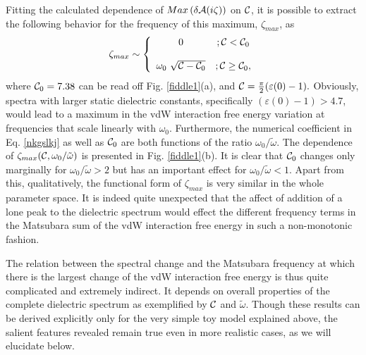 \documentclass[letterpaper,twocolumn,amsmath,amssymb,floatfix,aps,superscriptaddress]{revtex4}
\begin{document}
Fitting the calculated dependence of $Max\left(\delta{\cal A}(i\zeta)\right)$ on ${\cal C}$, it is possible to extract the following behavior for the frequency of this maximum, $\zeta_{max}$, as 
\begin{equation}
\zeta_{max} \sim \left\{
\begin{array}{cc}
0 &;  {\cal C} < {{\cal C}_0} \\
~ & ~ \\
 \omega_0 ~ \sqrt{{\cal C}-{{\cal C}_0}} &;  {\cal C} \geq {\cal C}_0, \\
\end{array}\right.  
\label{nkgslkj}
\end{equation}
where ${\cal C}_0 = 7.38$ can be read off Fig. \ref{fiddle1}(a), and ${\cal C} = \frac{\pi}{2}(\varepsilon(0) - 1).$ Obviously, spectra with larger static dielectric constants, specifically $(\varepsilon(0) - 1) > 4.7$, would lead to a maximum in the vdW interaction free energy variation at frequencies that scale linearly with $\omega_0$.  Furthermore, the numerical coefficient in Eq. \ref{nkgslkj} as well as ${\cal C}_0$ are both functions of the ratio ${\omega_0}/{\tilde\omega}$. The dependence of $\zeta_{max}({\cal C}, {\omega_0}/{\tilde\omega})$  is presented in Fig. \ref{fiddle1}(b). It is clear that ${\cal C}_0$ changes only marginally for ${\omega_0}/{\tilde\omega} > 2$ but has an important effect for ${\omega_0}/{\tilde\omega} < 1$. Apart from this, qualitatively, the functional form of $\zeta_{max}$ is very similar in the whole parameter space. It is indeed quite unexpected that the affect of addition of a lone peak to the dielectric spectrum would effect the different frequency terms in the Matsubara sum of the vdW interaction free energy in such a non-monotonic fashion. 


The relation between the spectral change and the Matsubara frequency at which there is the largest change of the vdW interaction free energy is thus quite complicated and extremely indirect. It depends on overall properties of the complete dielectric spectrum as exemplified by ${\cal C}$ and ${\tilde\omega}$. Though these results can be derived explicitly only for the very simple toy model explained above, the salient features revealed remain true even in more realistic cases, as we will elucidate below. 
\end{document}

